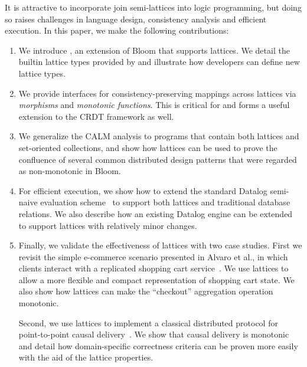 It is attractive to incorporate join semi-lattices into logic programming,  but doing so raises challenges in language design, consistency analysis and efficient execution.  In this paper, we make the following contributions:
\begin{enumerate}

\item
  We introduce \lang, an extension of Bloom that supports lattices. We detail
  the builtin lattice types provided by \lang and illustrate how developers can
  define new lattice types.
  
\item 
  We provide interfaces for consistency-preserving mappings across lattices via
  \emph{morphisms} and \emph{monotonic functions}.  This is critical for \lang
  and forms a useful extension to the CRDT framework as well.

\item 
  We generalize the CALM analysis to programs that contain both lattices and
  set-oriented collections, and show how lattices can be used to prove the
  confluence of several common distributed design patterns that were regarded as
  non-monotonic in Bloom. %

\item
  For efficient execution, we show how to extend the standard Datalog semi-naive
  evaluation scheme~\cite{Balbin1987} to support both lattices and traditional
  database relations. We also describe how an existing Datalog engine can be
  extended to support lattices with relatively minor changes.

\item
  Finally, we validate the effectiveness of lattices with two case studies. First we
  revisit the simple e-commerce scenario presented in Alvaro et al., in which
  clients interact with a replicated shopping cart service~\cite{Alvaro2011}. We
  use lattices to allow a more flexible and compact representation of shopping
  cart state. We also show how lattices can make the ``checkout'' aggregation
  operation monotonic.

  Second, we use lattices to implement a classical distributed protocol for
  point-to-point causal delivery~\cite{Schiper1989}. We show that causal
  delivery is monotonic and detail how domain-specific correctness criteria can
  be proven more easily with the aid of the lattice properties.
\end{enumerate}
